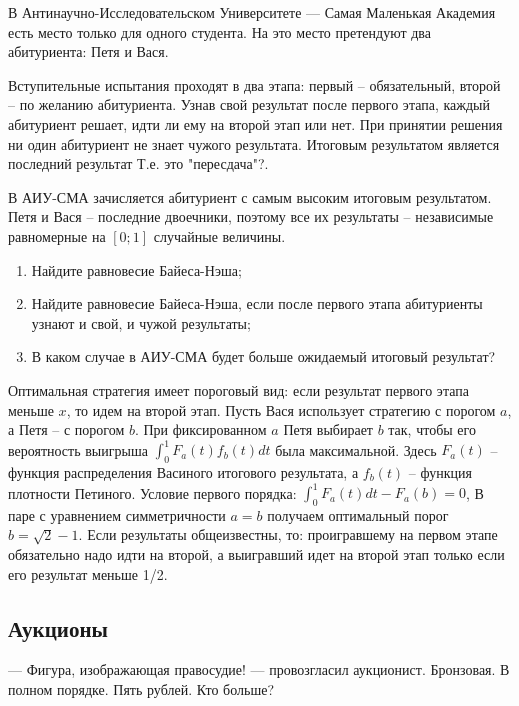 \begin{problem}
В Антинаучно-Исследовательском Университете --- Самая Маленькая Академия есть место только для одного студента. На это место претендуют два абитуриента: Петя и Вася.

Вступительные испытания проходят в два этапа: первый -- обязательный, второй -- по желанию абитуриента. Узнав свой результат после первого этапа, каждый абитуриент решает, идти ли ему на второй этап или нет. При принятии решения ни один абитуриент не знает чужого результата. Итоговым результатом является последний результат {\red Т.е. это "пересдача"?}.

В АИУ-СМА зачисляется абитуриент с самым высоким итоговым результатом. Петя и Вася -- последние двоечники, поэтому все их результаты -- независимые равномерные на $[0;1]$ случайные величины.

\begin{enumerate}
\item Найдите равновесие Байеса-Нэша;
\item Найдите равновесие Байеса-Нэша, если после первого этапа абитуриенты узнают и свой, и чужой результаты;
\item В каком случае в АИУ-СМА будет больше ожидаемый итоговый результат?
\end{enumerate}




\begin{sol}
Оптимальная стратегия имеет пороговый вид: если результат первого этапа меньше $x$, то идем на второй этап. Пусть Вася использует стратегию с порогом $a$, а Петя -- с порогом $b$. При фиксированном $a$ Петя выбирает $b$ так, чтобы его вероятность выигрыша $\int_{0}^{1}F_{a}(t)f_{b}(t)dt$ была максимальной. Здесь $F_{a}(t)$ -- функция распределения Васиного итогового результата, а $f_{b}(t)$ -- функция плотности Петиного. Условие первого порядка: $\int_{0}^{1}F_{a}(t)dt-F_{a}(b)=0$,  В паре с уравнением симметричности $a=b$ получаем оптимальный порог $b=\sqrt{2}-1$. Если результаты общеизвестны, то: проигравшему на первом этапе обязательно надо идти на второй, а выигравший идет на второй этап только если его результат меньше 1/2.
\end{sol}
\end{problem}



\subsection{Аукционы}
\begin{rem}
--- Фигура, изображающая правосудие! --- провозгласил аукционист. Бронзовая. В полном порядке. Пять рублей. Кто больше?
\end{rem}



